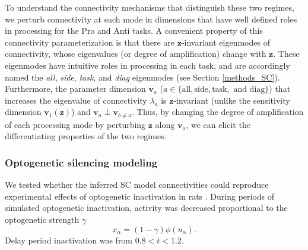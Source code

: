 \documentclass[11pt]{article}
\begin{document}
To understand the connectivity mechanisms that distinguish these two regimes, we perturb connectivity at each mode in dimensions that have well defined roles in processing for the Pro and Anti tasks.
A convenient property of this connectivity parameterization is that there are $\mathbf{z}$-invariant eigenmodes of connectivity, whose eigenvalues (or degree of amplification) change with $\mathbf{z}$.
These eigenmodes have intuitive roles in processing in each task, and are accordingly named the \textit{all}, \textit{side}, \textit{task}, and \textit{diag} eigenmodes (see Section \ref{methods_SC}).
Furthermore, the parameter dimension $\mathbf{v}_a$ ($a \in \{\text{all}, \text{side}, \text{task}, \text{ and diag}\}$) that increases the eigenvalue of connectivity $\lambda_a$ is $\mathbf{z}$-invariant (unlike the sensitivity dimension $\mathbf{v}_1(\mathbf{z})$) and $\mathbf{v}_a \perp \mathbf{v}_{b \neq a}$.
Thus, by changing the degree of amplification of each processing mode by  perturbing $\mathbf{z}$ along $\mathbf{v}_a$, we can elicit the differentiating properties of the two regimes.

%

\subsubsection{Optogenetic silencing modeling} \label{methods_sc_opto}
We tested whether the inferred SC model connectivities could reproduce experimental effects of optogenetic inactivation in rats \cite{duan2015requirement}.
During periods of simulated optogenetic inactivation, activity was decreased proportional to the optogenetic strength $\gamma$
\begin{equation}
x_\alpha = (1-\gamma)\phi(u_\alpha).
\end{equation}
Delay period inactivation was from $0.8 < t < 1.2$.
\end{document}
